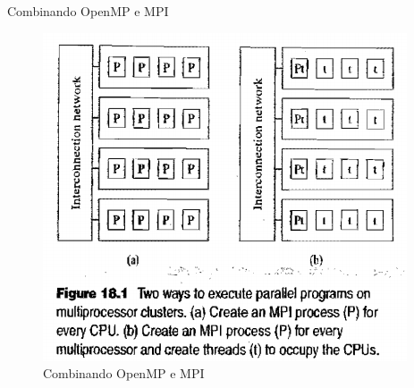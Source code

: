 \begin{frame}{Combinando OpenMP e MPI}
	\begin{figure}
		\centering
		\includegraphics[width=0.6\linewidth]{img/quinn/openMP+MPI}
		\caption[Combinando OpenMP e MPI]{Combinando OpenMP e MPI}
		\label{fig:openMP+MPI}
\end{figure}
\end{frame}


